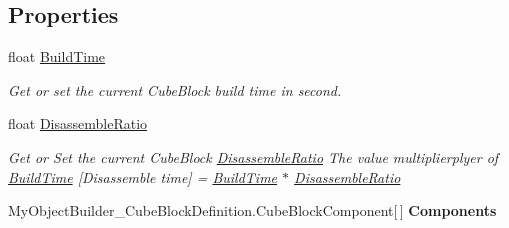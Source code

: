 \subsection*{Properties}
\begin{DoxyCompactItemize}
\item 
float \hyperlink{class_s_e_mod_a_p_i_1_1_a_p_i_1_1_definitions_1_1_cube_blocks_1_1_cube_block_definition_a5c5b656ffe7af1c69101204a3fc672d6}{Build\+Time}
\begin{DoxyCompactList}\small\item\em Get or set the current Cube\+Block build time in second. \end{DoxyCompactList}\item 
float \hyperlink{class_s_e_mod_a_p_i_1_1_a_p_i_1_1_definitions_1_1_cube_blocks_1_1_cube_block_definition_a1826902442f5db239c0179d6892e1cc7}{Disassemble\+Ratio}
\begin{DoxyCompactList}\small\item\em Get or Set the current Cube\+Block \hyperlink{class_s_e_mod_a_p_i_1_1_a_p_i_1_1_definitions_1_1_cube_blocks_1_1_cube_block_definition_a1826902442f5db239c0179d6892e1cc7}{Disassemble\+Ratio} The value multiplierplyer of \hyperlink{class_s_e_mod_a_p_i_1_1_a_p_i_1_1_definitions_1_1_cube_blocks_1_1_cube_block_definition_a5c5b656ffe7af1c69101204a3fc672d6}{Build\+Time} \mbox{[}Disassemble time\mbox{]} = \hyperlink{class_s_e_mod_a_p_i_1_1_a_p_i_1_1_definitions_1_1_cube_blocks_1_1_cube_block_definition_a5c5b656ffe7af1c69101204a3fc672d6}{Build\+Time} $\ast$ \hyperlink{class_s_e_mod_a_p_i_1_1_a_p_i_1_1_definitions_1_1_cube_blocks_1_1_cube_block_definition_a1826902442f5db239c0179d6892e1cc7}{Disassemble\+Ratio} \end{DoxyCompactList}\item 
\hypertarget{class_s_e_mod_a_p_i_1_1_a_p_i_1_1_definitions_1_1_cube_blocks_1_1_cube_block_definition_aa92b059e4bbaab99797ae8e7a8829851}{}My\+Object\+Builder\+\_\+\+Cube\+Block\+Definition.\+Cube\+Block\+Component\mbox{[}$\,$\mbox{]} {\bfseries Components}\label{class_s_e_mod_a_p_i_1_1_a_p_i_1_1_definitions_1_1_cube_blocks_1_1_cube_block_definition_aa92b059e4bbaab99797ae8e7a8829851}


\end{DoxyCompactItemize}
